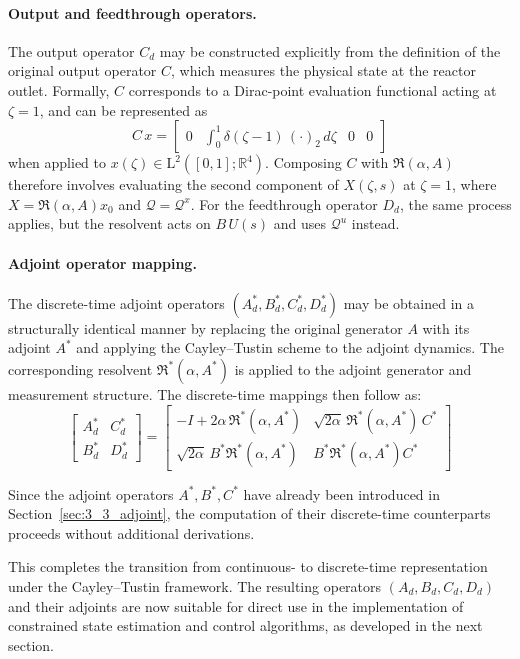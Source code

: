 \paragraph{Output and feedthrough operators.}  
The output operator $C_d$ may be constructed explicitly from the definition of the original output operator $C$, which measures the physical state at the reactor outlet. Formally, $C$ corresponds to a Dirac-point evaluation functional acting at $\zeta = 1$, and can be represented as
\begin{equation}
C\,x = \begin{bmatrix}
0 & \int_0^1 \delta(\zeta - 1)\,(\cdot)_2\,d\zeta & 0 & 0
\end{bmatrix}
\end{equation}
when applied to $x(\zeta) \in \mathrm{L}^2([0,1]; \mathbb{R}^4)$. Composing $C$ with $\mathfrak{R}(\alpha, A)$ therefore involves evaluating the second component of $X(\zeta, s)$ at $\zeta = 1$, where $X = \mathfrak{R}(\alpha, A) x_0$ and $\mathcal{Q} = \mathcal{Q}^x$. For the feedthrough operator $D_d$, the same process applies, but the resolvent acts on $B\,U(s)$ and uses $\mathcal{Q}^u$ instead.

\paragraph{Adjoint operator mapping.}  
The discrete-time adjoint operators $(A_d^*, B_d^*, C_d^*, D_d^*)$ may be obtained in a structurally identical manner by replacing the original generator $A$ with its adjoint $A^*$ and applying the Cayley--Tustin scheme to the adjoint dynamics. The corresponding resolvent $\mathfrak{R}^*(\alpha, A^*)$ is applied to the adjoint generator and measurement structure. The discrete-time mappings then follow as:
\begin{equation}
\begin{bmatrix}
A_d^* & C_d^* \\
B_d^* & D_d^*
\end{bmatrix}
=
\begin{bmatrix}
-I + 2\alpha\, \mathfrak{R}^*(\alpha, A^*) & \sqrt{2\alpha}\, \mathfrak{R}^*(\alpha, A^*)\, C^* \\
\sqrt{2\alpha}\, B^* \mathfrak{R}^*(\alpha, A^*) & B^* \mathfrak{R}^*(\alpha, A^*) C^*
\end{bmatrix}
\end{equation}

Since the adjoint operators $A^*, B^*, C^*$ have already been introduced in Section~\ref{sec:3_3_adjoint}, the computation of their discrete-time counterparts proceeds without additional derivations.

This completes the transition from continuous- to discrete-time representation under the Cayley--Tustin framework. The resulting operators $(A_d, B_d, C_d, D_d)$ and their adjoints are now suitable for direct use in the implementation of constrained state estimation and control algorithms, as developed in the next section.
